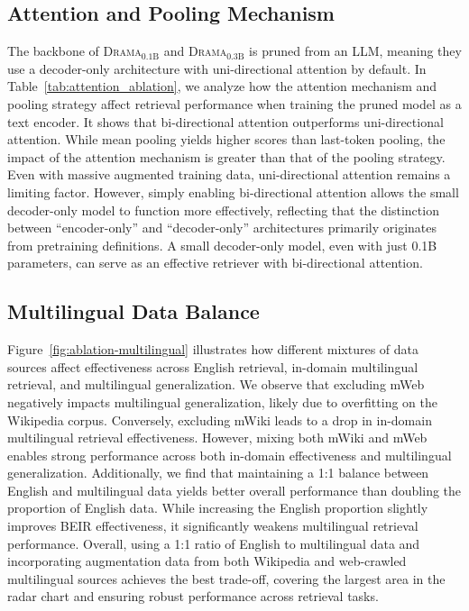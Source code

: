 \documentclass[]{fairmeta}
\newcommand{\ourmodel}{\textsc{Drama}}
\begin{document}
\subsection{Attention and Pooling Mechanism}
The backbone of \ourmodel{}$_\text{0.1B}$ and \ourmodel{}$_\text{0.3B}$ is pruned from an LLM, meaning they use a decoder-only architecture with uni-directional attention by default. In Table~\ref{tab:attention_ablation}, we analyze how the attention mechanism and pooling strategy affect retrieval performance when training the pruned model as a text encoder.
It shows that bi-directional attention outperforms uni-directional attention.
While mean pooling yields higher scores than last-token pooling, the impact of the attention mechanism is greater than that of the pooling strategy.
Even with massive augmented training data, uni-directional attention remains a limiting factor.
However, simply enabling bi-directional attention allows the small decoder-only model to function more effectively, reflecting that the distinction between ``encoder-only'' and ``decoder-only'' architectures primarily originates from pretraining definitions.
A small decoder-only model, even with just 0.1B parameters, can serve as an effective retriever with bi-directional attention.

\subsection{Multilingual Data Balance}
\label{sec:multilingual-ablation}
Figure~\ref{fig:ablation-multilingual} illustrates how different mixtures of data sources affect effectiveness across English retrieval, in-domain multilingual retrieval, and multilingual generalization.
We observe that excluding mWeb negatively impacts multilingual generalization, likely due to overfitting on the Wikipedia corpus. Conversely, excluding mWiki leads to a drop in in-domain multilingual retrieval effectiveness. However, mixing both mWiki and mWeb enables strong performance across both in-domain effectiveness and multilingual generalization.
Additionally, we find that maintaining a 1:1 balance between English and multilingual data yields better overall performance than doubling the proportion of English data. While increasing the English proportion slightly improves BEIR effectiveness, it significantly weakens multilingual retrieval performance.
Overall, using a 1:1 ratio of English to multilingual data and incorporating augmentation data from both Wikipedia and web-crawled multilingual sources achieves the best trade-off, covering the largest area in the radar chart and ensuring robust performance across retrieval tasks.
\end{document}
